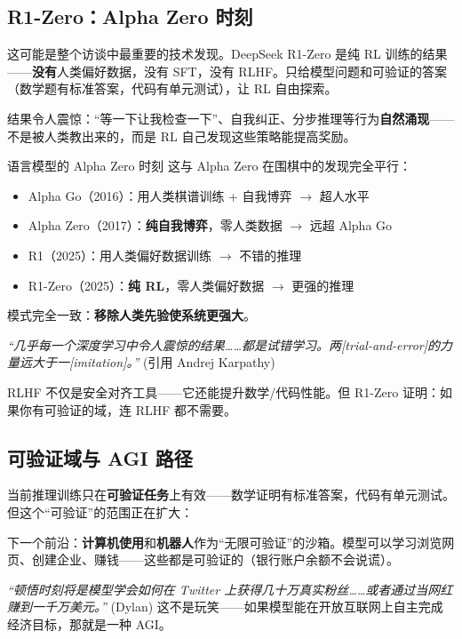 \documentclass[a4paper]{article}
\begin{document}
\subsection{R1-Zero：Alpha Zero 时刻}

这可能是整个访谈中最重要的技术发现。DeepSeek R1-Zero 是纯 RL 训练的结果——\textbf{没有}人类偏好数据，没有 SFT，没有 RLHF。只给模型问题和可验证的答案（数学题有标准答案，代码有单元测试），让 RL 自由探索。

结果令人震惊：``等一下让我检查一下''、自我纠正、分步推理等行为\textbf{自然涌现}——不是被人类教出来的，而是 RL 自己发现这些策略能提高奖励。

\begin{importantbox}{语言模型的 Alpha Zero 时刻}
这与 Alpha Zero 在围棋中的发现完全平行：
\begin{itemize}
    \item Alpha Go（2016）：用人类棋谱训练 + 自我博弈 $\to$ 超人水平
    \item Alpha Zero（2017）：\textbf{纯自我博弈}，零人类数据 $\to$ 远超 Alpha Go
    \item R1（2025）：用人类偏好数据训练 $\to$ 不错的推理
    \item R1-Zero（2025）：\textbf{纯 RL}，零人类偏好数据 $\to$ 更强的推理
\end{itemize}

模式完全一致：\textbf{移除人类先验使系统更强大}。

\textit{``几乎每一个深度学习中令人震惊的结果……都是试错学习。两{[}trial-and-error{]}的力量远大于一{[}imitation{]}。''} (引用 Andrej Karpathy)

RLHF 不仅是安全对齐工具——它还能提升数学/代码性能。但 R1-Zero 证明：如果你有可验证的域，连 RLHF 都不需要。
\end{importantbox}

\subsection{可验证域与 AGI 路径}

当前推理训练只在\textbf{可验证任务}上有效——数学证明有标准答案，代码有单元测试。但这个``可验证''的范围正在扩大：

下一个前沿：\textbf{计算机使用}和\textbf{机器人}作为``无限可验证''的沙箱。模型可以学习浏览网页、创建企业、赚钱——这些都是可验证的（银行账户余额不会说谎）。

\textit{``顿悟时刻将是模型学会如何在 Twitter 上获得几十万真实粉丝……或者通过当网红赚到一千万美元。''} (Dylan) 这不是玩笑——如果模型能在开放互联网上自主完成经济目标，那就是一种 AGI。
\end{document}
